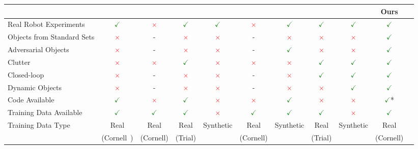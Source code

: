 \documentclass[conference]{IEEEtran}
\newcommand{\yes}{\textcolor{ForestGreen}{$\checkmark$}}
\newcommand{\no}{\textcolor{red}{$\times$}}
\begin{document}
\begin{table*}[t!]
    \begin{center}
        \vspace{-3mm}
        \begin{tabular}{@{}lcccccccccc@{}}
        \toprule
        & \cite{Lenz2015DeepGrasps} & \cite{Redmon2015Real-timeNetworks} & \cite{Pinto2016SupersizingHours} & \cite{Johns2016DeepUncertainty} & \cite{Kumra2017RoboticNetworks} & \cite{Mahler2017Dex2} & \cite{Levine2017LearningCollection} & \cite{Viereck2017LearningImages} & \textbf{Ours} \\
        \midrule
        
        Real Robot Experiments             & \yes & \no  & \yes & \yes & \no  & \yes & \yes & \yes & \yes \\
        Objects from Standard Sets         & \no  & -    & \no  & \no  & -    & \no  & \no  & \no  & \yes \\
        Adversarial Objects~\cite{Mahler2017Dex2}
                                           & \no  & -    & \no  & \no  & -    & \yes & \no  & \no  & \yes \\
        Clutter                            & \no  & \no  & \yes & \no  & \no  & \no  & \yes & \yes & \yes \\
        Closed-loop                        & \no  & -    & \no  & \no  & -    & \no  & \yes & \yes & \yes \\
        Dynamic Objects                    & \no  & -    & \no  & \no  & -    & \no  & \no  & \yes & \yes \\
        Code Available                     & \yes & \no  & \yes & \no  & \no  & \yes & \no  & \no  & \yes* \\
        Training Data Available            & \yes & \yes & \yes & \no  & \yes & \yes & \yes & \no  & \yes \\
        Training Data Type                 & Real & Real & Real & Synthetic 
                                                                       & Real & Synthetic
                                                                                     & Real & Synthetic
                                                                                                   & Real \\
                                           & (Cornell~\cite{Lenz2015DeepGrasps}) 
                                                  & (Cornell) 
                                                         &(Trial)&      & (Cornell)
                                                                              &      &(Trial)&      & (Cornell)\\
        

\end{tabular}
\end{center}
\end{table*}
\end{document}
